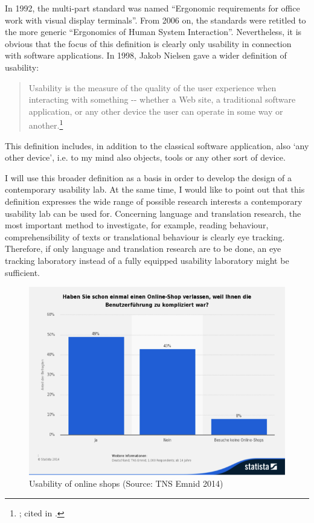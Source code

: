 \documentclass[output=paper]{langsci/langscibook}
\begin{document}
In 1992, the multi-part standard was named ``Ergonomic requirements for office work with visual display terminals''. From 2006 on, the standards were retitled to the more generic ``Ergonomics of Human System Interaction''. Nevertheless, it is obvious that the focus of this definition is clearly only usability in connection with software applications. In 1998, Jakob Nielsen gave a wider definition of usability:

\begin{quote}
Usability is the measure of the quality of the user experience when interacting with something -{}- whether a Web site, a traditional software application, or any other device the user can operate in some way or another.\footnote{ \citet{Nielsen1998}; cited in \citet{Eichinger1999}.}
\end{quote}

This definition includes, in addition to the classical software application, also `any other device', i.e. to my mind also objects, tools or any other sort of device. 

I will use this broader definition as a basis in order to develop the design of a contemporary usability lab. At the same time, I would like to point out that this definition expresses the wide range of possible research interests a contemporary usability lab can be used for. Concerning language and translation research, the most important method to investigate, for example, reading behaviour, comprehensibility of texts or translational behaviour is clearly eye tracking. Therefore, if only language and translation research are to be done, an eye tracking laboratory instead of a fully equipped usability laboratory might be sufficient.

  
\begin{figure}
 \includegraphics[width=\textwidth]{figures/Roesener1.png}
 \caption{Usability of online shops (Source: TNS Emnid 2014)}
 \label{roesener:fig:1}
\end{figure} 
 
\end{document}

